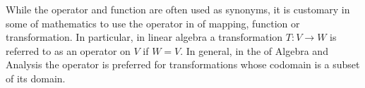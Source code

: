 \documentclass[12pt]{article}
\begin{document}
While the  operator and function are  often used as synonyms, it is customary in some  of mathematics to use the  operator in  of mapping, function or transformation. In particular, in linear algebra a transformation $T: V \to W$ is referred to as an operator on $V$ if $W = V$. In general, in the  of Algebra and  Analysis the  operator is preferred for transformations whose codomain is a subset of its domain.
\end{document}
